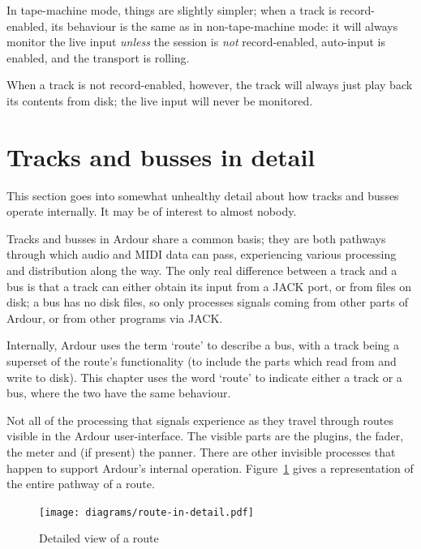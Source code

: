 \documentclass[10pt,a4paper]{book}
\begin{document}
In tape-machine mode, things are slightly simpler; when a track is
record-enabled, its behaviour is the same as in non-tape-machine mode:
it will always monitor the live input \emph{unless} the session is
\emph{not} record-enabled, auto-input is enabled, and the transport is
rolling.

When a track is not record-enabled, however, the track will always
just play back its contents from disk; the live input will never be
monitored.




\section{Tracks and busses in detail}

\begin{ddanger}
This section goes into somewhat unhealthy detail about how tracks and
busses operate internally.  It may be of interest to almost nobody.
\end{ddanger}

Tracks and busses in Ardour share a common basis; they are both
pathways through which audio and MIDI data can pass, experiencing
various processing and distribution along the way.  The only real
difference between a track and a bus is that a track can either obtain
its input from a JACK port, or from files on disk; a bus has no disk
files, so only processes signals coming from other parts of Ardour, or
from other programs via JACK\@.

Internally, Ardour uses the term `route' to describe a bus, with a
track being a superset of the route's functionality (to include the
parts which read from and write to disk).  This chapter uses the word
`route' to indicate either a track or a bus, where the two have the
same behaviour.

Not all of the processing that signals experience as they travel
through routes visible in the Ardour user-interface. The visible parts
are the plugins, the fader, the meter and (if present) the panner.
There are other invisible processes that happen to support Ardour's
internal operation.  Figure~\ref{fig:route-in-detail} gives a
representation of the entire pathway of a route.

\begin{figure}[ht]
\begin{center}
\texttt{[image: diagrams/route-in-detail.pdf]}
\end{center}
\caption{Detailed view of a route}
\label{fig:route-in-detail}
\end{figure}
\end{document}
